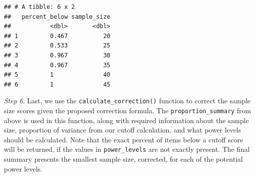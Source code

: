 \documentclass[
  man]{apa7}
\newenvironment{Shaded}{\begin{snugshade}}{\end{snugshade}}
\newcommand{\AttributeTok}[1]{\textcolor[rgb]{0.13,0.29,0.53}{#1}}
\newcommand{\CommentTok}[1]{\textcolor[rgb]{0.56,0.35,0.01}{\textit{#1}}}
\newcommand{\DecValTok}[1]{\textcolor[rgb]{0.00,0.00,0.81}{#1}}
\newcommand{\FunctionTok}[1]{\textcolor[rgb]{0.13,0.29,0.53}{\textbf{#1}}}
\newcommand{\NormalTok}[1]{#1}
\newcommand{\OtherTok}[1]{\textcolor[rgb]{0.56,0.35,0.01}{#1}}
\newcommand{\SpecialCharTok}[1]{\textcolor[rgb]{0.81,0.36,0.00}{\textbf{#1}}}
\newcommand{\StringTok}[1]{\textcolor[rgb]{0.31,0.60,0.02}{#1}}
\begin{document}
\begin{Shaded}
\end{Shaded}

\begin{verbatim}
## # A tibble: 6 x 2
##   percent_below sample_size
##           <dbl>       <dbl>
## 1         0.467          20
## 2         0.533          25
## 3         0.967          30
## 4         0.967          35
## 5         1              40
## 6         1              45
\end{verbatim}

\emph{Step 6}. Last, we use the \texttt{calculate\_correction()} function to correct the sample size scores given the proposed correction formula. The \texttt{proportion\_summary} from above is used in this function, along with required information about the sample size, proportion of variance from our cutoff calculation, and what power levels should be calculated. Note that the exact percent of items below a cutoff score will be returned, if the values in \texttt{power\_levels} are not exactly present. The final summary presents the smallest sample size, corrected, for each of the potential power levels.

\begin{Shaded}
\end{Shaded}
\end{document}
